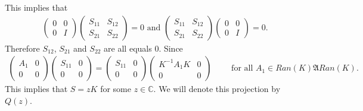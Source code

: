 \documentclass[a4paper,10pt]{amsart}
\newcommand{\AAA}{\mathfrak A}
\newcommand{\C}{\mathbb C} %
\begin{document}
This implies that
\begin{align*}
   \begin{pmatrix}
      0 & 0\\
      0 & I
   \end{pmatrix}
   \begin{pmatrix}
       S_{11} & S_{12}\\
       S_{21} & S_{22}
   \end{pmatrix} = 0 \mbox{ and }
   \begin{pmatrix}
       S_{11} & S_{12}\\
       S_{21} & S_{22}
   \end{pmatrix}
    \begin{pmatrix}
      0 & 0\\
      0 & I
   \end{pmatrix} = 0.
\end{align*}
Therefore $S_{12}$, $S_{21}$ and $S_{22}$ are all equals $0$.
Since
\begin{align*}
   \begin{pmatrix}
       A_{1} & 0 \\
       0 & 0
   \end{pmatrix} 
   \begin{pmatrix}
       S_{11} & 0 \\
       0 & 0
   \end{pmatrix}
   = 
   \begin{pmatrix}
       S_{11} & 0 \\
       0 & 0
   \end{pmatrix}
   \begin{pmatrix}
       K^{-1}A_{1}K & 0 \\
       0 & 0
   \end{pmatrix} \qquad \mbox{ for all $A_{1} \in Ran(K)\AAA Ran(K)$}. 
\end{align*}
This implies that $S = z K$ for some $z \in \C$. We will denote 
this projection by $Q(z)$.
\end{document}
